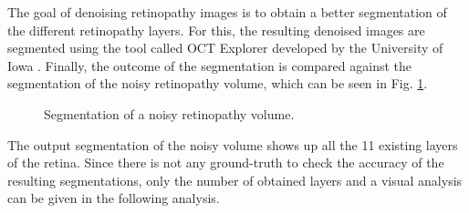 The goal of denoising retinopathy images is to obtain a better segmentation of the different retinopathy layers. For this, the resulting denoised images are segmented using the tool called OCT Explorer developed by the University of Iowa \cite{iowa}. Finally, the outcome of the segmentation is compared against the segmentation of the noisy retinopathy volume, which can be seen in Fig. \ref{fig:setup_retinopathy_segmentation_setup}.

\begin{figure}[H]
  \centering
  \caption{Segmentation of a noisy retinopathy volume.} 
  \label{fig:setup_retinopathy_segmentation_setup}
\end{figure}

The output segmentation of the noisy volume shows up all the 11 existing layers of the retina. Since there is not any ground-truth to check the accuracy of the resulting segmentations, only the number of obtained layers and a visual analysis can be given in the following analysis.  